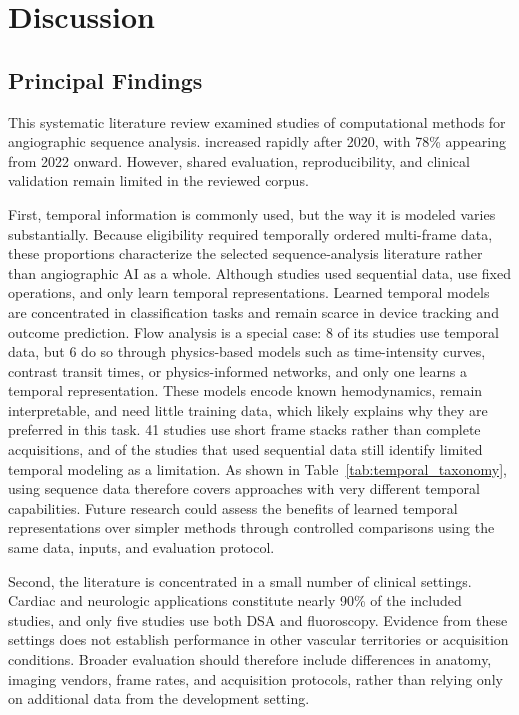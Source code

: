 \section{Discussion}\label{sec:discussion}

\subsection{Principal Findings}

This systematic literature review examined  studies of computational methods for angiographic sequence analysis.  increased rapidly after 2020, with 78\% appearing from 2022 onward. However, shared evaluation, reproducibility, and clinical validation remain limited in the reviewed corpus. 

First, temporal information is commonly used, but the way it is modeled varies substantially. Because eligibility required temporally ordered multi-frame data, these proportions characterize the selected sequence-analysis literature rather than angiographic AI as a whole. Although  studies  used sequential data,  use fixed operations, and only  learn temporal representations. Learned temporal models are concentrated in classification tasks and remain scarce in device tracking and outcome prediction. Flow analysis is a special case:  8 of its studies use temporal data, but 6 do so through physics-based models such as time-intensity curves, contrast transit times, or physics-informed networks, and only one learns a temporal representation. These models encode known hemodynamics, remain interpretable, and need little training data, which likely explains why they are preferred in this task.  41 studies use short frame stacks rather than complete acquisitions, and  of the  studies that used sequential data still identify limited temporal modeling as a limitation. As shown in Table~\ref{tab:temporal_taxonomy}, using sequence data therefore covers approaches with very different temporal capabilities. Future research could assess the benefits of learned temporal representations over simpler methods through controlled comparisons using the same data, inputs, and evaluation protocol.

Second, the literature is concentrated in a small number of clinical settings. Cardiac and neurologic applications constitute nearly 90\% of the included studies, and only five studies use both DSA and fluoroscopy. Evidence from these settings does not establish performance in other vascular territories or acquisition conditions. Broader evaluation should therefore include differences in anatomy, imaging vendors, frame rates, and acquisition protocols, rather than relying only on additional data from the development setting.

